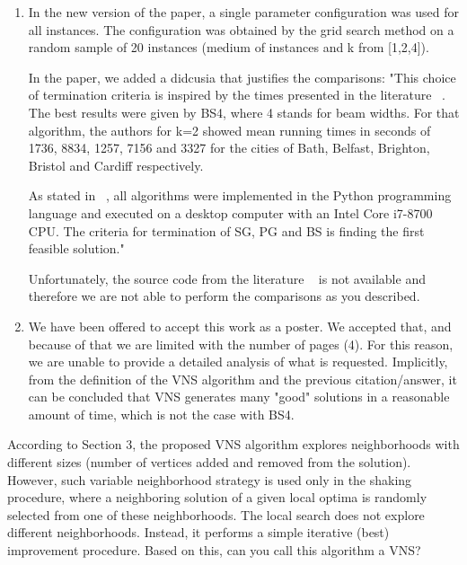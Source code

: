 \documentclass [11pt]{scrartcl}
\begin{document}
\begin{enumerate}
	\item In the new version of the paper, a single parameter configuration was used for all instances. The configuration was obtained by the grid search method on a random sample of 20 instances (medium of instances and k from [1,2,4]).
	
	In the paper, we added a didcusia that justifies the comparisons:
	"This choice of termination criteria is inspired by the times presented in the literature ~\cite{corcoran2021heuristics}. The best results were given by BS4, where 4 stands for beam widths. For that algorithm, the authors for k=2 showed mean running times in seconds of 1736, 8834, 1257, 7156 and 3327 for the cities of Bath, Belfast, Brighton, Bristol and Cardiff respectively.
	
	As stated in ~\cite{corcoran2021heuristics}, all algorithms were implemented in the Python programming language and executed on a desktop computer with an Intel Core i7-8700 CPU. The criteria for termination of SG, PG and BS is finding the first feasible solution."
	
	Unfortunately, the source code from the literature ~\cite{corcoran2021heuristics} is not available and therefore we are not able to perform the comparisons as you described.
	
	\item We have been offered to accept this work as a poster. We accepted that, and because of that we are limited with the number of pages (4). For this reason, we are unable to provide a detailed analysis of what is requested. Implicitly, from the definition of the VNS algorithm and the previous citation/answer, it can be concluded that VNS generates many "good" solutions in a reasonable amount of time, which is not the case with BS4.
\end{enumerate}


\begin{leftbar}	
According to Section 3, the proposed VNS algorithm explores neighborhoods with different sizes (number of vertices added and removed from the solution). However, such variable neighborhood strategy is used only in the shaking procedure, where a neighboring solution of a given local optima is randomly selected from one of these neighborhoods. The local search does not explore different neighborhoods. Instead, it performs a simple iterative (best) improvement procedure. Based on this, can you call this algorithm a VNS?
\end{leftbar}
\end{document}
